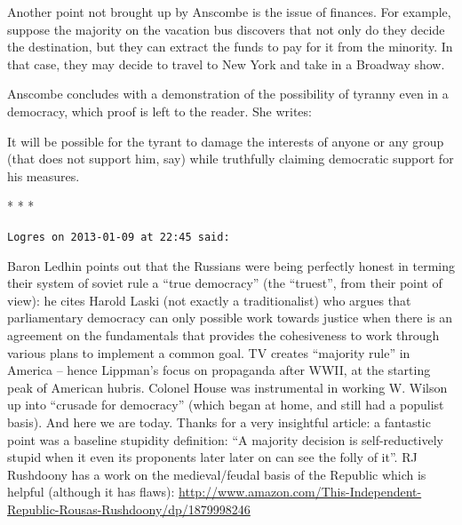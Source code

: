 Another point not brought up by Anscombe is the issue of finances. For example, suppose the majority on the vacation bus discovers that not only do they decide the destination, but they can extract the funds to pay for it from the minority. In that case, they may decide to travel to New York and take in a Broadway show.

Anscombe concludes with a demonstration of the possibility of tyranny even in a democracy, which proof is left to the reader. She writes:

\begin{quotex}
It will be possible for the tyrant to damage the interests of anyone or any group (that does not support him, say) while truthfully claiming democratic support for his measures.
\end{quotex}




\begin{center}* * *\end{center}

\begin{footnotesize}
\begin{sffamily}
\texttt{Logres on 2013-01-09 at 22:45 said:}

Baron Ledhin points out that the Russians were being perfectly honest in terming their system of soviet rule a ``true democracy'' (the ``truest'', from their point of view): he cites Harold Laski (not exactly a traditionalist) who argues that parliamentary democracy can only possible work towards justice when there is an agreement on the fundamentals that provides the cohesiveness to work through various plans to implement a common goal. TV creates ``majority rule'' in America -- hence Lippman's focus on propaganda after WWII, at the starting peak of American hubris. Colonel House was instrumental in working W. Wilson up into ``crusade for democracy'' (which began at home, and still had a populist basis). And here we are today. Thanks for a very insightful article: a fantastic point was a baseline stupidity definition: ``A majority decision is self-reductively stupid when it even its proponents later later on can see the folly of it''. RJ Rushdoony has a work on the medieval/feudal basis of the Republic which is helpful (although it has flaws): \url{http://www.amazon.com/This-Independent-Republic-Rousas-Rushdoony/dp/1879998246}

\hfill

\end{sffamily}
\end{footnotesize}

